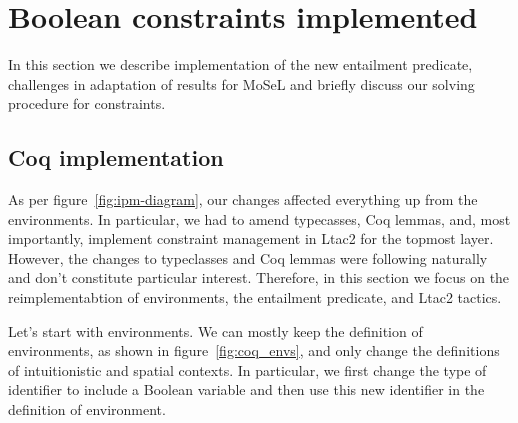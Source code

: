 \begin{itemize}


\end{itemize}

\section{Boolean constraints implemented}

In this section we describe implementation of the new entailment predicate, challenges in adaptation of \citet{harlandResourceDistributionBooleanConstraints2003} results for MoSeL and briefly discuss our solving procedure for constraints.

\subsection{Coq implementation}
\label{subsec:ipm_constr_coq_implementation}

As per figure~\ref{fig:ipm-diagram}, our changes affected everything up from the environments.
In particular, we had to amend typecasses, Coq lemmas, and, most importantly, implement constraint management in Ltac2 for the topmost layer.
However, the changes to typeclasses and Coq lemmas were following naturally and don't constitute particular interest.
Therefore, in this section we focus on the reimplementabtion of environments, the entailment predicate, and Ltac2 tactics.

Let's start with environments.
We can mostly keep the definition of environments, as shown in figure~\ref{fig:coq_envs}, and only change the definitions of intuitionistic and spatial contexts.
In particular, we first change the type of identifier to include a Boolean variable and then use this new identifier in the definition of environment.

